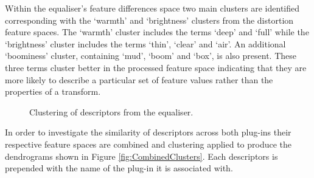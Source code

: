 		Within the equaliser's feature differences space two main clusters are identified corresponding with the
		`warmth' and `brightness' clusters from the distortion feature spaces. The `warmth' cluster includes the
		terms `deep' and `full' while the `brightness' cluster includes the terms `thin', `clear' and `air'. An
		additional `boominess' cluster, containing `mud', `boom' and `box', is also present. These three terms
		cluster better in the processed feature space indicating that they are more likely to describe a particular
		set of feature values rather than the properties of a transform.

		\begin{figure}[h!]
			\centering
			\qquad
			\caption{Clustering of descriptors from the equaliser.}
			\label{fig:EqualiserClusters}
		\end{figure}
		
		In order to investigate the similarity of descriptors across both plug-ins their respective feature spaces
		are combined and clustering applied to produce the dendrograms shown in Figure \ref{fig:CombinedClusters}.
		Each descriptors is prepended with the name of the plug-in it is associated with.

